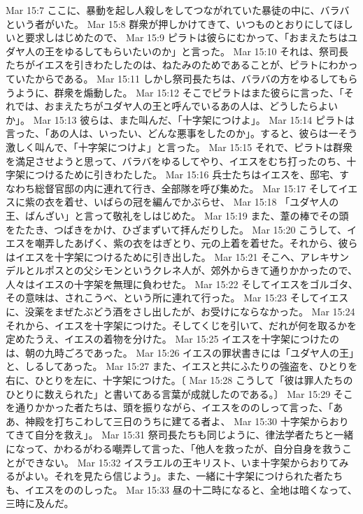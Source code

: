 Mar 15:7  ここに、暴動を起し人殺しをしてつながれていた暴徒の中に、バラバという者がいた。
Mar 15:8  群衆が押しかけてきて、いつものとおりにしてほしいと要求しはじめたので、
Mar 15:9  ピラトは彼らにむかって、「おまえたちはユダヤ人の王をゆるしてもらいたいのか」と言った。
Mar 15:10  それは、祭司長たちがイエスを引きわたしたのは、ねたみのためであることが、ピラトにわかっていたからである。
Mar 15:11  しかし祭司長たちは、バラバの方をゆるしてもらうように、群衆を煽動した。
Mar 15:12  そこでピラトはまた彼らに言った、「それでは、おまえたちがユダヤ人の王と呼んでいるあの人は、どうしたらよいか」。
Mar 15:13  彼らは、また叫んだ、「十字架につけよ」。
Mar 15:14  ピラトは言った、「あの人は、いったい、どんな悪事をしたのか」。すると、彼らは一そう激しく叫んで、「十字架につけよ」と言った。
Mar 15:15  それで、ピラトは群衆を満足させようと思って、バラバをゆるしてやり、イエスをむち打ったのち、十字架につけるために引きわたした。
Mar 15:16  兵士たちはイエスを、邸宅、すなわち総督官邸の内に連れて行き、全部隊を呼び集めた。
Mar 15:17  そしてイエスに紫の衣を着せ、いばらの冠を編んでかぶらせ、
Mar 15:18  「ユダヤ人の王、ばんざい」と言って敬礼をしはじめた。
Mar 15:19  また、葦の棒でその頭をたたき、つばきをかけ、ひざまずいて拝んだりした。
Mar 15:20  こうして、イエスを嘲弄したあげく、紫の衣をはぎとり、元の上着を着せた。それから、彼らはイエスを十字架につけるために引き出した。
Mar 15:21  そこへ、アレキサンデルとルポスとの父シモンというクレネ人が、郊外からきて通りかかったので、人々はイエスの十字架を無理に負わせた。
Mar 15:22  そしてイエスをゴルゴタ、その意味は、されこうべ、という所に連れて行った。
Mar 15:23  そしてイエスに、没薬をまぜたぶどう酒をさし出したが、お受けにならなかった。
Mar 15:24  それから、イエスを十字架につけた。そしてくじを引いて、だれが何を取るかを定めたうえ、イエスの着物を分けた。
Mar 15:25  イエスを十字架につけたのは、朝の九時ごろであった。
Mar 15:26  イエスの罪状書きには「ユダヤ人の王」と、しるしてあった。
Mar 15:27  また、イエスと共にふたりの強盗を、ひとりを右に、ひとりを左に、十字架につけた。〔
Mar 15:28  こうして「彼は罪人たちのひとりに数えられた」と書いてある言葉が成就したのである。〕
Mar 15:29  そこを通りかかった者たちは、頭を振りながら、イエスをののしって言った、「ああ、神殿を打ちこわして三日のうちに建てる者よ、
Mar 15:30  十字架からおりてきて自分を救え」。
Mar 15:31  祭司長たちも同じように、律法学者たちと一緒になって、かわるがわる嘲弄して言った、「他人を救ったが、自分自身を救うことができない。
Mar 15:32  イスラエルの王キリスト、いま十字架からおりてみるがよい。それを見たら信じよう」。また、一緒に十字架につけられた者たちも、イエスをののしった。
Mar 15:33  昼の十二時になると、全地は暗くなって、三時に及んだ。
